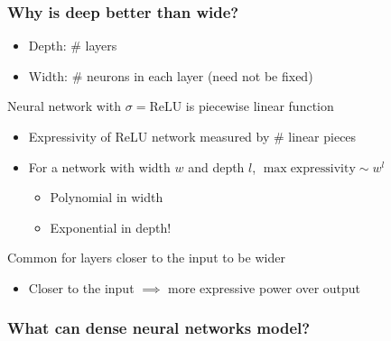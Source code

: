 \begin{frame}
    \frametitle{Why is deep better than wide?}
    \begin{itemize}
        \item Depth: \# layers
        \item Width: \# neurons in each layer (need not be fixed)
    \end{itemize}
    \pause

    Neural network with $\sigma = \text{ReLU}$ is piecewise linear function
    \begin{itemize}
        \item \alert{Expressivity} of ReLU network measured by \# linear pieces
        \item For a network with width $w$ and depth $l$, \alert{$\max \text{expressivity} \sim w^l$} \citep{Pascanu13,MontufarNIPS14,Chen16}
        \begin{itemize}
            \item Polynomial in width
            \item Exponential in depth!
        \end{itemize}
    \end{itemize}
    \pause

    Common for layers closer to the input to be wider
    \begin{itemize}
        \item Closer to the input $\implies$ more expressive power over output \citep{RaghuICML17}
    \end{itemize}
\end{frame}

\begin{frame}
    \frametitle{What can dense neural networks model?}
\end{frame}


